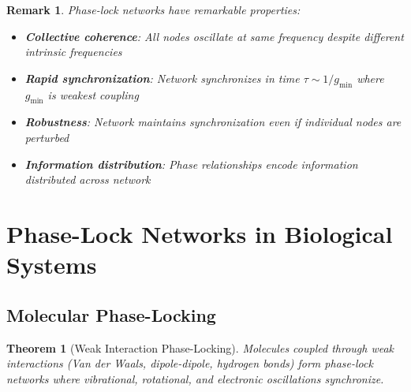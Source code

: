 \documentclass[12pt,a4paper]{article}
\newtheorem{theorem}{Theorem}
\newtheorem{remark}{Remark}
\begin{document}
\begin{remark}
Phase-lock networks have remarkable properties:
\begin{itemize}
\item \textbf{Collective coherence}: All nodes oscillate at same frequency despite different intrinsic frequencies
\item \textbf{Rapid synchronization}: Network synchronizes in time $\tau \sim 1/g_{\text{min}}$ where $g_{\text{min}}$ is weakest coupling
\item \textbf{Robustness}: Network maintains synchronization even if individual nodes are perturbed
\item \textbf{Information distribution}: Phase relationships encode information distributed across network
\end{itemize}
\end{remark}

\section{Phase-Lock Networks in Biological Systems}

\subsection{Molecular Phase-Locking}

\begin{theorem}[Weak Interaction Phase-Locking]
\label{thm:weak_interaction_locking}
Molecules coupled through weak interactions (Van der Waals, dipole-dipole, hydrogen bonds) form phase-lock networks where vibrational, rotational, and electronic oscillations synchronize.
\end{theorem}
\end{document}
